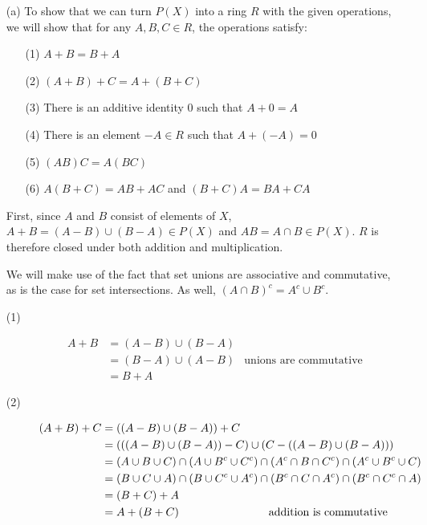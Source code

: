 \documentclass{hmwk}
\begin{document}
\begin{solution}
\begin{itemize}
    \item[(a)] 
    To show that we can turn $P(X)$ into a ring $R$ with the given operations, we will show that for any $A, B, C \in R$, the operations satisfy:

    \begin{itemize}
        \item[(1)] $A + B = B + A$ 
        \item[(2)] $(A + B) + C = A + (B + C)$
        \item[(3)] There is an additive identity $0$ such that $A + 0 = A$
        \item[(4)] There is an element $-A \in R$ such that $A + (-A) = 0$
        \item[(5)] $(AB)C = A(BC)$
        \item[(6)] $A(B + C) = AB + AC$ and $(B + C)A = BA + CA$
    \end{itemize}

    First, since $A$ and $B$ consist of elements of $X$, $A + B = (A - B) \cup (B - A) \in P(X)$ and $AB = A \cap B \in P(X)$. $R$ is therefore closed under both addition and multiplication.

    We will make use of the fact that set unions are associative and commutative, as is the case for set intersections. As well, $(A \cap B)^c = A^c \cup B^c$.

    \begin{description}
        \item[(1)] \begin{align*}
            A + B &= (A - B) \cup (B - A) \\
            &= (B - A) \cup (A - B) & \text{unions are commutative}\\
            &= B + A
        \end{align*}
        \item[(2)] \begin{align*}
            (A + B) + C &= ((A - B) \cup (B - A)) + C \\
            &= (((A - B) \cup (B - A)) - C) \cup (C - ((A - B) \cup (B - A))) \\
            &= (A \cup B \cup C) \cap (A \cup B^c \cup C^c) \cap (A^c \cap B \cap C^c) \cap (A^c \cup B^c \cup C) \\
            &= (B \cup C \cup A) \cap (B \cup C^c \cup A^c) \cap (B^c \cap C \cap A^c) \cap (B^c \cap C^c \cap A) \\
            &= (B + C) + A \\
            &= A + (B + C) \text{\hspace{8em}addition is commutative}
        \end{align*}


\end{description}
\end{itemize}
\end{solution}
\end{document}
